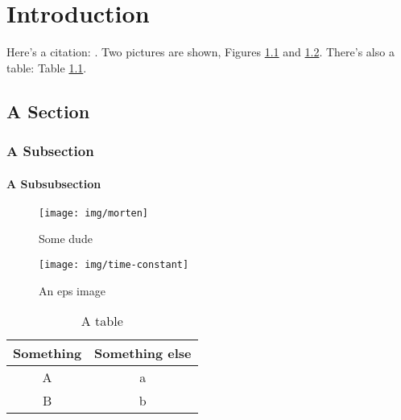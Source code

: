 \chapter{Introduction}\label{cha:introduction}
%
Here's a citation: \cite{Wacker2016}. Two pictures are shown, Figures \ref{fig:morten} and \ref{fig:eps}. There's also a table: Table \ref{tab:a-table}.

\section{A Section}\label{sec:a-section}

\subsection{A Subsection}\label{ssec:a-subsection}

\subsubsection{A Subsubsection}\label{sssec:a-subsubsection}

\lipsum[2]

\begin{figure}[htbp]
  \centering
  \texttt{[image: img/morten]}
  \caption{Some dude}
  \label{fig:morten}
\end{figure}

\begin{figure}[htbp]
  \centering
  \texttt{[image: img/time-constant]}
  \caption{An eps image}
  \label{fig:eps}
\end{figure}

\begin{table}[htbp]
  \centering
  \caption{A table}
  \begin{tabular}{cc}
    \toprule
    Something & Something else \\
    \midrule
    A & a \\
    B & b \\
    \bottomrule
  \end{tabular}
  \label{tab:a-table}
\end{table}

